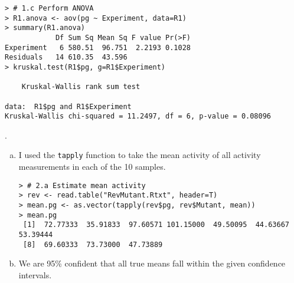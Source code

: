 \documentclass[a4paper, 10pt]{article}
\newcounter{prob_num}
\newcommand{\problem}{\vspace{20pt}\arabic{prob_num}.\stepcounter{prob_num}\par}
\begin{document}
\begin{enumerate}[(a)]
\begin{verbatim}
> # 1.c Perform ANOVA
> R1.anova <- aov(pg ~ Experiment, data=R1)
> summary(R1.anova)
            Df Sum Sq Mean Sq F value Pr(>F)
Experiment   6 580.51  96.751  2.2193 0.1028
Residuals   14 610.35  43.596               
> kruskal.test(R1$pg, g=R1$Experiment)

	Kruskal-Wallis rank sum test

data:  R1$pg and R1$Experiment 
Kruskal-Wallis chi-squared = 11.2497, df = 6, p-value = 0.08096
\end{verbatim}

\end{enumerate}

\problem

\begin{enumerate}[(a)]
\item I used the \texttt{tapply} function to take the mean activity of all activity measurements in each of the 10 samples.

\begin{verbatim}
> # 2.a Estimate mean activity
> rev <- read.table("RevMutant.Rtxt", header=T)
> mean.pg <- as.vector(tapply(rev$pg, rev$Mutant, mean))
> mean.pg
 [1]  72.77333  35.91833  97.60571 101.15000  49.50095  44.63667  53.39444
 [8]  69.60333  73.73000  47.73889
\end{verbatim}

\item We are 95\% confident that all true means fall within the given confidence intervals.


\end{enumerate}
\end{document}
